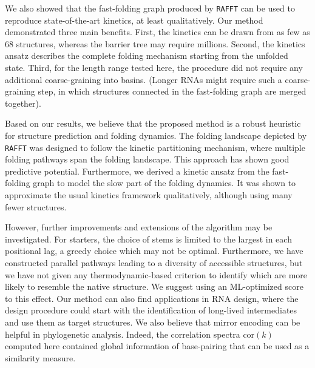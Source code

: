 We also showed that the fast-folding graph produced by \texttt{RAFFT} can be used to reproduce state-of-the-art kinetics, at least qualitatively. Our method demonstrated three main benefits. First, the kinetics can be drawn from as few as $68$ structures, whereas the barrier tree may require millions. Second, the kinetics ansatz describes the complete folding mechanism starting from the unfolded state. Third, for the length range tested here, the procedure did not require any additional coarse-graining into basins. (Longer RNAs might require such a coarse-graining step, in which structures connected in the fast-folding graph are merged together).

Based on our results, we believe that the proposed method is a robust heuristic for structure prediction and folding dynamics. The folding landscape depicted by \texttt{RAFFT} was designed to follow the kinetic partitioning mechanism, where multiple folding pathways span the folding landscape. This approach has shown good predictive potential. Furthermore, we derived a kinetic ansatz from the fast-folding graph to model the slow part of the folding dynamics. It was shown to approximate the usual kinetics framework qualitatively, although using many fewer structures. 

However, further improvements and extensions of the algorithm may be investigated. For starters, the choice of stems is limited to the largest in each positional lag, a greedy choice which may not be optimal. Furthermore, we have constructed parallel pathways leading to a diversity of accessible structures, but we have not given any thermodynamic-based criterion to identify which are more likely to resemble the native structure. We suggest using an ML-optimized score to this effect. Our method can also find applications in RNA design, where the design procedure could start with the identification of long-lived intermediates and use them as target structures. We also believe that mirror encoding can be helpful in phylogenetic analysis. Indeed, the correlation spectra \(\text{cor}(k)\) computed here contained global information of base-pairing that can be used as a similarity measure.

